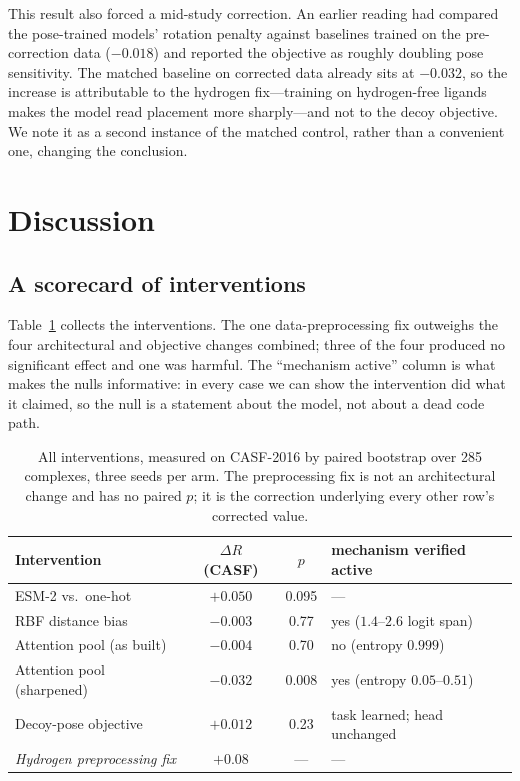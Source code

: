 \documentclass[11pt]{article}
\begin{document}
This result also forced a mid-study correction. An earlier reading had compared the
pose-trained models' rotation penalty against baselines trained on the pre-correction data
($-0.018$) and reported the objective as roughly doubling pose sensitivity. The matched
baseline on corrected data already sits at $-0.032$, so the increase is attributable to the
hydrogen fix---training on hydrogen-free ligands makes the model read placement more
sharply---and not to the decoy objective. We note it as a second instance of the matched
control, rather than a convenient one, changing the conclusion.

\section{Discussion}

\subsection{A scorecard of interventions}

Table~\ref{tab:scorecard} collects the interventions. The one data-preprocessing fix
outweighs the four architectural and objective changes combined; three of the four produced
no significant effect and one was harmful. The ``mechanism active'' column is what makes the
nulls informative: in every case we can show the intervention did what it claimed, so the
null is a statement about the model, not about a dead code path.

\begin{table}[t]
\centering
\begin{tabular}{lccl}
\toprule
Intervention & $\Delta R$ (CASF) & $p$ & mechanism verified active \\
\midrule
ESM-2 vs.\ one-hot            & $+0.050$ & 0.095 & --- \\
RBF distance bias             & $-0.003$ & 0.77  & yes ($1.4$--$2.6$ logit span) \\
Attention pool (as built)     & $-0.004$ & 0.70  & no (entropy $0.999$) \\
Attention pool (sharpened)    & $-0.032$ & 0.008 & yes (entropy $0.05$--$0.51$) \\
Decoy-pose objective          & $+0.012$ & 0.23  & task learned; head unchanged \\
\textit{Hydrogen preprocessing fix} & \textit{$+0.08$} & --- & --- \\
\bottomrule
\end{tabular}
\caption{All interventions, measured on CASF-2016 by paired bootstrap over 285 complexes,
three seeds per arm. The preprocessing fix is not an architectural change and has no paired
$p$; it is the correction underlying every other row's corrected value.}
\label{tab:scorecard}
\end{table}
\end{document}
